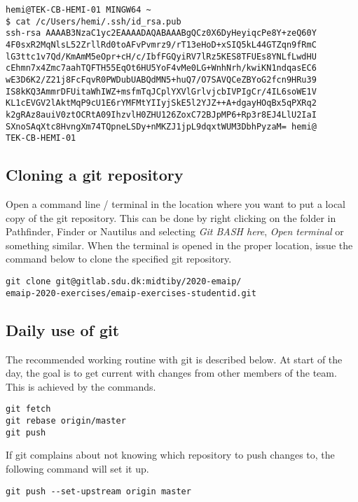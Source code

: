 \begin{verbatim}
hemi@TEK-CB-HEMI-01 MINGW64 ~
$ cat /c/Users/hemi/.ssh/id_rsa.pub
ssh-rsa AAAAB3NzaC1yc2EAAAADAQABAAABgQCz0X6DyHeyiqcPe8Y+zeQ60Y
4F0sxR2MqNlsL52ZrllRd0toAFvPvmrz9/rT13eHoD+xSIQ5kL44GTZqn9fRmC
lG3ttc1v7Qd/KmAmM5eOpr+cH/c/IbfFGQyiRV7lRz5KES8TFUEs8YNLfLwdHU
cEhmn7x4Zmc7aahTQFTH55EqOt6HU5YoF4vMe0LG+WnhNrh/kwiKN1ndqasEC6
wE3D6K2/Z21j8FcFqvR0PWDubUABQdMN5+huQ7/O7SAVQCeZBYoG2fcn9HRu39
IS8kKQ3AmmrDFUitaWhIWZ+msfmTqJCplYXVlGrlvjcbIVPIgCr/4IL6soWE1V
KL1cEVGV2lAktMqP9cU1E6rYMFMtYIIyjSkE5l2YJZ++A+dgayHOqBx5qPXRq2
k2gRAz8auiV0ztOCRtA09IhzvlH0ZHU126ZoxC72BJpMP6+Rp3r8EJ4LlU2IaI
SXnoSAqXtc8HvngXm74TQpneLSDy+nMKZJ1jpL9dqxtWUM3DbhPyzaM= hemi@
TEK-CB-HEMI-01
\end{verbatim}


\subsection{Cloning a git repository}

Open a command line / terminal in the location where you
want to put a local copy of the git repository.
This can be done by right clicking on the folder in 
Pathfinder, Finder or Nautilus and selecting 
\emph{Git BASH here}, \emph{Open terminal} or something similar.
When the terminal is opened in the proper location, issue the 
command below to clone the specified git repository.
\begin{verbatim}
git clone git@gitlab.sdu.dk:midtiby/2020-emaip/
emaip-2020-exercises/emaip-exercises-studentid.git

\end{verbatim}


\subsection{Daily use of git}

The recommended working routine with git is 
described below.
At start of the day, the goal is to get current
with changes from other members of the team.
This is achieved by the commands.
\begin{verbatim}
git fetch
git rebase origin/master
git push
\end{verbatim}
If git complains about not knowing which repository to push
changes to, the following command will
set it up.

\begin{verbatim}
git push --set-upstream origin master
\end{verbatim}

 